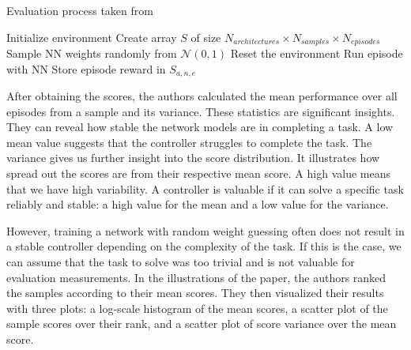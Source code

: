 \begin{algorithm}
\caption{Evaluation process taken from \cite{oller_analyzing_2020}}
\begin{algorithmic}[1]
\State Initialize environment
\State Create array $S$ of size $N_{architectures} \times N_{samples} \times N_{episodes}$
    \State Sample NN weights randomly from $\mathcal{N}(0,1)$
      \State Reset the environment
      \State Run episode with NN
      \State Store episode reward in $S_{a,n,e}$
    \EndFor
\EndFor
\end{algorithmic}
\label{alg:environment-evaluation}
\end{algorithm}

After obtaining the scores, the authors calculated the mean performance over all episodes from a sample and its variance. These statistics are significant insights. They can reveal how stable the network models are in completing a task. A low mean value suggests that the controller struggles to complete the task. The variance gives us further insight into the score distribution. It illustrates how spread out the scores are from their respective mean score. A high value means that we have high variability. A controller is valuable if it can solve a specific task reliably and stable: a high value for the mean and a low value for the variance.

However, training a network with random weight guessing often does not result in a stable controller depending on the complexity of the task. If this is the case, we can assume that the task to solve was too trivial and is not valuable for evaluation measurements. In the illustrations of the paper, the authors ranked the samples according to their mean scores. They then visualized their results with three plots: a log-scale histogram of the mean scores, a scatter plot of the sample scores over their rank, and a scatter plot of score variance over the mean score.

